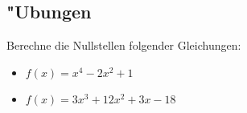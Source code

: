 \subsection{"Ubungen}
Berechne die Nullstellen folgender Gleichungen:
\begin{itemize}
\item $f(x) = x^4 - 2x^2 + 1$
\item $f(x) = 3x^3 + 12x^2 + 3x - 18$
\end{itemize}